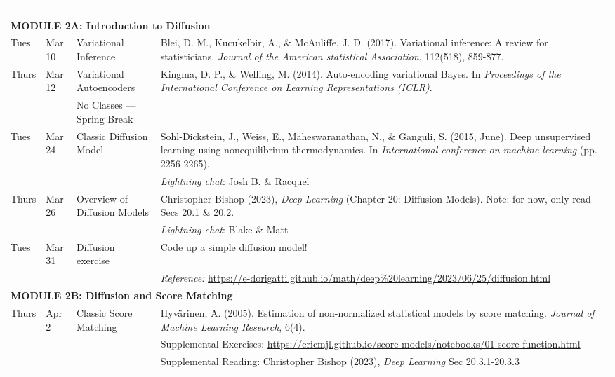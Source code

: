 \documentclass[letterpaper]{inzane_syllabus} %
\begin{document}
\begin{center}
\begin{tabularx}{\textwidth}{p{2cm}p{2cm}p{8cm}p{8cm}}
&&& \\
\arrayrulecolor{myCOLOR}
\multicolumn{4}{l}{\textbf{\textcolor{myCOLOR}{\huge MODULE 2: Machine Learning}}} \\
\hline \hline 
&&& \\
\multicolumn{4}{l}{\textbf{\textcolor{myCOLOR}{\large MODULE 2A: Introduction to Diffusion}}} \\
\hline
Tues & Mar 10 & Variational Inference & Blei, D. M., Kucukelbir, A., \& McAuliffe, J. D. (2017). Variational inference: A review for statisticians. \textit{Journal of the American statistical Association}, 112(518), 859-877.\\
Thurs & Mar 12 & Variational Autoencoders & Kingma, D. P., \& Welling, M. (2014). Auto-encoding variational Bayes. In \textit{Proceedings of the International Conference on Learning Representations (ICLR)}. \\
&  & No Classes --- Spring Break & \\
Tues & Mar 24 & Classic Diffusion Model & Sohl-Dickstein, J., Weiss, E., Maheswaranathan, N., \& Ganguli, S. (2015, June). Deep unsupervised learning using nonequilibrium thermodynamics. In \textit{International conference on machine learning} (pp. 2256-2265).\\
& & & \textit{Lightning chat}: Josh B. \& Racquel\\
Thurs & Mar 26 & Overview of Diffusion Models &  Christopher Bishop (2023), \textit{Deep Learning} (Chapter 20: Diffusion Models). Note: for now, only read Secs 20.1 \& 20.2. \\
& & & \textit{Lightning chat}: Blake \& Matt \\
Tues & Mar 31 & Diffusion exercise &  Code up a simple diffusion model! \\
& & & \textit{Reference:} \url{https://e-dorigatti.github.io/math/deep\%20learning/2023/06/25/diffusion.html} \\
\hline
\multicolumn{4}{l}{\textbf{\textcolor{myCOLOR}{\large MODULE 2B: Diffusion and Score Matching}}} \\
\hline
Thurs & Apr 2  & Classic Score Matching &  Hyvärinen, A. (2005). Estimation of non-normalized statistical models by score matching. \textit{Journal of Machine Learning Research}, 6(4).\\
& & & Supplemental Exercises: \url{https://ericmjl.github.io/score-models/notebooks/01-score-function.html} \\
& & & Supplemental Reading: Christopher Bishop (2023), \textit{Deep Learning} Sec 20.3.1-20.3.3 \\

\end{tabularx}
\end{center}
\end{document}

